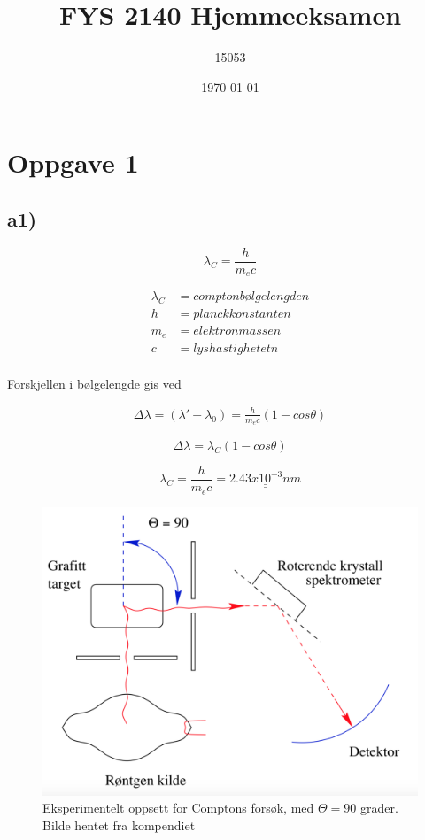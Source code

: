 \documentclass[norsk,a4paper,12pt]{article}
\title{FYS 2140 Hjemmeeksamen}
\author{15053}
\date{\today}
\begin{document}
\maketitle



\section*{Oppgave 1}

\subsection*{a1)}

\begin{equation}
\lambda_C = \frac{h}{m_ec}
\end{equation}


\begin{align*}
\lambda_C &= comptonbølgelengden \\
h &= planckkonstanten \\
m_e &= elektronmassen \\
c &= lyshastighetetn \\
\end{align*}

Forskjellen i bølgelengde gis ved 

\begin{align*}
\Delta \lambda = (\lambda' - \lambda_0) = \frac{h}{m_ec}(1-cos\theta)
\end{align*}

\begin{equation}
\Delta\lambda = \lambda_C(1-cos\theta)
\label{eq:1}
\end{equation}


\begin{equation}
\lambda_C = \frac{h}{m_ec}= \underline{\underline{2.43 x 10^{-3} nm}}
\end{equation}





\begin{figure}[h]
\includegraphics[scale=0.4]{compton}
\caption{Eksperimentelt oppsett for Comptons forsøk, med $\Theta =90$ grader. Bilde hentet fra kompendiet}
\label{fig:compton}
\end{figure}
\end{document}
